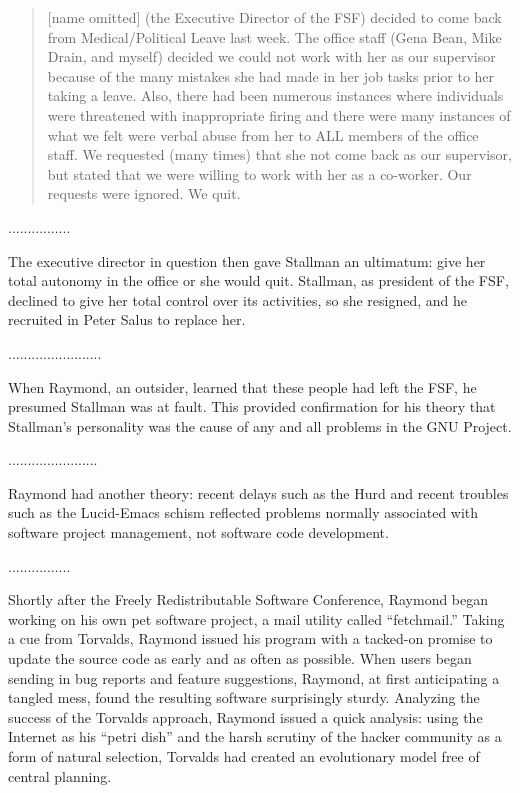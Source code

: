 \ifdefined\eng
\begin{quote}
[name omitted] (the Executive Director of the FSF) decided to come back from Medical/Political Leave last week. The office staff (Gena Bean, Mike Drain, and myself) decided we could not work with her as our supervisor because of the many mistakes she had made in her job tasks prior to her taking a leave.  Also, there had been numerous instances where individuals were threatened with inappropriate firing and there  were many instances of what we felt were verbal abuse from her to ALL members of the office staff.  We requested (many times) that she not come back as our supervisor, but stated that we were willing to work with her as a co-worker.  Our requests were ignored.  We quit.
\end{quote}
\fi

\ifdefined\chs
................
\fi

\ifdefined\eng
The executive director in question then gave Stallman an ultimatum: give her total autonomy in the office or she would quit.  Stallman, as president of the FSF, declined to give her total control over its activities, so she resigned, and he recruited in Peter Salus to replace her.
\fi

\ifdefined\chs
........................
\fi

\ifdefined\eng
When Raymond, an outsider, learned that these people had left the FSF, he presumed Stallman was at fault.  This provided confirmation for his theory that Stallman's personality was the cause of any and all problems in the GNU Project.
\fi

\ifdefined\chs
.......................
\fi

\ifdefined\eng
Raymond had another theory: recent delays such as the Hurd and recent troubles such as the Lucid-Emacs schism reflected problems normally associated with software project management, not software code development.
\fi

\ifdefined\chs
................
\fi

\ifdefined\eng
Shortly after the Freely Redistributable Software Conference, Raymond began working on his own pet software project, a mail utility called ``fetchmail.'' Taking a cue from Torvalds, Raymond issued his program with a tacked-on promise to update the source code as early and as often as possible. When users began sending in bug reports and feature suggestions, Raymond, at first anticipating a tangled mess, found the resulting software surprisingly sturdy. Analyzing the success of the Torvalds approach, Raymond issued a quick analysis: using the Internet as his ``petri dish'' and the harsh scrutiny of the hacker community as a form of natural selection, Torvalds had created an evolutionary model free of central planning.
\fi

